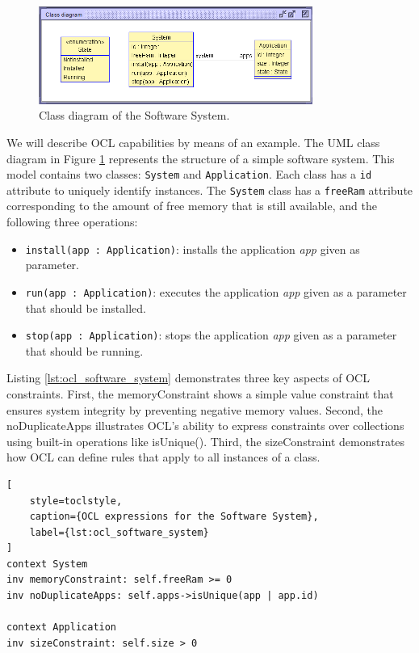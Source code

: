 \begin{figure}
    \begin{center}
        \includegraphics[width=0.8\textwidth]{figures/c1/SoftwareSystem/SS_Ver4.png}
        \caption{Class diagram of the Software System.}
        \label{fig:class_diagram_software_system}
    \end{center}
\end{figure}
We will describe OCL capabilities by means of an example. The UML class diagram in 
Figure \ref{fig:class_diagram_software_system} represents the structure of a simple 
software system. This model contains two classes: \texttt{System} and \texttt{Application}. 
Each class has a \texttt{id} attribute to uniquely identify instances. The \texttt{System}
class has a \texttt{freeRam} attribute corresponding to the amount of free memory that 
is still available, and the following three operations:
\begin{itemize}
    \setlength{\itemsep}{0pt}
    \setlength{\parskip}{0pt}
    \setlength{\parsep}{0pt}
    \item \texttt{install(app : Application)}: installs the application \textit{app} given as parameter.
    \item \texttt{run(app : Application)}: executes the application \textit{app} given as a
    parameter that should be installed.
    \item \texttt{stop(app : Application)}: stops the application \textit{app} given as a
    parameter that should be running.
\end{itemize}

Listing \ref{lst:ocl_software_system} demonstrates three key aspects of OCL constraints. 
First, the memoryConstraint shows a simple value constraint that ensures system 
integrity by preventing negative memory values. Second, the noDuplicateApps 
illustrates OCL's ability to express constraints over collections using built-in 
operations like isUnique(). Third, the sizeConstraint demonstrates how OCL can 
define rules that apply to all instances of a class.
\begin{lstlisting}[
    style=toclstyle, 
    caption={OCL expressions for the Software System}, 
    label={lst:ocl_software_system}
]
context System
inv memoryConstraint: self.freeRam >= 0
inv noDuplicateApps: self.apps->isUnique(app | app.id)   

context Application
inv sizeConstraint: self.size > 0
\end{lstlisting}

